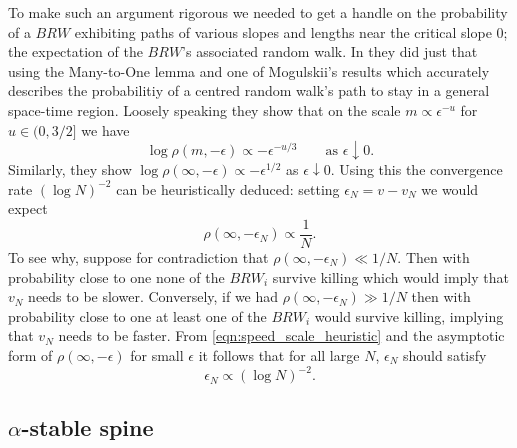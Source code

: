 To make such an argument rigorous we needed to get a handle on the probability of a $BRW$ exhibiting paths of various slopes and lengths near the critical slope $0$; the expectation of the $BRW$'s associated random walk. In \cite{gantert2008asymptotics} they did just that using the Many-to-One lemma and one of Mogulskii's results which accurately describes the probabilitiy of a centred random walk's path to stay in a general space-time region. Loosely speaking they show that on the scale $m \propto \epsilon^{-u}$ for $u \in (0, 3/2]$ we have
\begin{equation}
\log \rho(m, -\epsilon) \propto - \epsilon^{-u/3}\qquad\text{as } \epsilon \downarrow 0. 
\end{equation}
Similarly, they show $\log\rho(\infty, -\epsilon) \propto - \epsilon^{1/2}$ as $\epsilon \downarrow 0$. Using this the convergence rate $(\log N)^{-2}$ can be heuristically deduced: setting $\epsilon_N = v - v_N$ we would expect 
\begin{equation}\label{eqn:speed_scale_heuristic}
\rho(\infty, - \epsilon_N) \propto \frac{1}{N}. 
\end{equation}
To see why, suppose for contradiction that $\rho(\infty, - \epsilon_N) \ll 1/N$. Then with probability close to one none of the $BRW_i$ survive killing which would imply that $v_N$ needs to be slower. Conversely, if we had $\rho(\infty, - \epsilon_N) \gg 1/N$ then with probability close to one at least one of the $BRW_i$ would survive killing, implying that $v_N$ needs to be faster. From \ref{eqn:speed_scale_heuristic} and the asymptotic form of $\rho(\infty, -\epsilon)$ for small $\epsilon$ it follows that for all large $N$, $\epsilon_N$ should satisfy
\begin{equation}
\epsilon_N \propto (\log N)^{-2}. 
\end{equation}

\subsection{$\alpha$-stable spine}\label{subsec:alpha_stable_spine}

